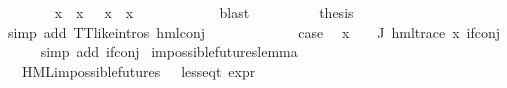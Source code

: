 \begin{isabellebody}
\ \ \ \ \ \ \isamarkupfalse%
\ {\isachardoublequoteopen}x{}{}\ {\isacharbackquote}{\kern0pt}\ x{}{}\ {\isacharequal}{\kern0pt}\ {\isacharbraceleft}{\kern0pt}{\isacharbraceright}{\kern0pt}{\isachardoublequoteclose}\ {\isachardoublequoteopen}x{}{}\ {\isacharbackquote}{\kern0pt}\ x{}{}\ {\isacharequal}{\kern0pt}\ {\isacharbraceleft}{\kern0pt}{\isacharbraceright}{\kern0pt}{\isachardoublequoteclose}\isanewline
\ \ \ \ \ \ \ \ \isamarkupfalse%
\ blast{\isacharplus}{\kern0pt}\isanewline
\ \ \ \ \ \ \isamarkupfalse%
\ \isamarkupfalse%
\ {\isacharquery}{\kern0pt}thesis\isanewline
\ \ \ \ \ \ \ \ \isamarkupfalse%
\ {\isacharparenleft}{\kern0pt}simp\ add{\isacharcolon}{\kern0pt}\ TT{\isacharunderscore}{\kern0pt}like{\isachardot}{\kern0pt}intros{\isacharparenleft}{\kern0pt}{}{\isacharparenright}{\kern0pt}\ hml{\isacharunderscore}{\kern0pt}conj{\isacharparenright}{\kern0pt}\isanewline
\ \ \ \ \isamarkupfalse%
\isanewline
\ \ \isamarkupfalse%
\isanewline
\ \ \isamarkupfalse%
\ \isamarkupfalse%
\ {\isacharquery}{\kern0pt}case\ \isamarkupfalse%
\ {\isacartoucheopen}{\isasymforall}x\ {\isasymin}\ {\isacharparenleft}{\kern0pt}{\isasymPhi}\ {\isacharbackquote}{\kern0pt}\ J{\isacharparenright}{\kern0pt}{\isachardot}{\kern0pt}\ {\isacharparenleft}{\kern0pt}hml{\isacharunderscore}{\kern0pt}trace\ x{\isacharparenright}{\kern0pt}{\isacartoucheclose}\ if{\isacharunderscore}{\kern0pt}conj\isanewline
\ \ \ \ \isamarkupfalse%
\ {\isacharparenleft}{\kern0pt}simp\ add{\isacharcolon}{\kern0pt}\ if{\isacharunderscore}{\kern0pt}conj{\isacharparenright}{\kern0pt}\isanewline
{}\isamarkupfalse%
%
\endisatagproof
{\isafoldproof}%
%
\isadelimproof
\isanewline
%
\endisadelimproof
\isanewline
{}\isamarkupfalse%
\ impossible{\isacharunderscore}{\kern0pt}futures{\isacharunderscore}{\kern0pt}lemma{\isacharcolon}{\kern0pt}\isanewline
\ \ \ {\isachardoublequoteopen}HML{\isacharunderscore}{\kern0pt}impossible{\isacharunderscore}{\kern0pt}futures\ {\isasymphi}\ {\isacharequal}{\kern0pt}\ less{\isacharunderscore}{\kern0pt}eq{\isacharunderscore}{\kern0pt}t\ {\isacharparenleft}{\kern0pt}expr\ {\isasymphi}{\isacharparenright}{\kern0pt}\ {\isacharparenleft}{\kern0pt}{\isasyminfinity}{\isacharcomma}{\kern0pt}\ {}{\isacharcomma}{\kern0pt}\ {}{\isacharcomma}{\kern0pt}\ {}{\isacharcomma}{\kern0pt}\ {\isasyminfinity}{\isacharcomma}{\kern0pt}\ {}{\isacharparenright}{\kern0pt}{\isachardoublequoteclose}\isanewline

\end{isabellebody}
